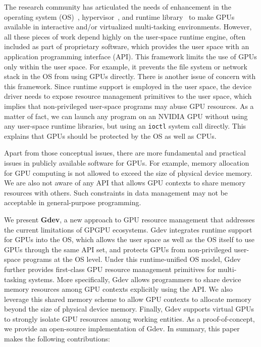 The research community has articulated the needs of enhancement in 
the operating system (OS)~\cite{Bautin_MCNC08, Kato_ATC11,
Rossbach_SOSP11}, hypervisor~\cite{Gupta_ATC11}, and runtime
library~\cite{Kato_RTSS11} to make GPUs available in interactive
and/or virtualized multi-tasking environments.
However, all these pieces of work depend highly on the user-space runtime
engine, often included as part of proprietary software, which provides
the user space with an application programming interface (API).
This framework limits the use of GPUs only within the user space.
For example, it prevents the file system or network stack in the OS from
using GPUs directly.
There is another issue of concern with this framework.
Since runtime support is employed in the user space, the device
driver needs to expose resource management primitives to the user space,
which implies that non-privileged user-space programs may abuse GPU
resources.
As a matter of fact, we can launch any program on an NVIDIA GPU without
using any user-space runtime libraries, but using an \texttt{ioctl}
system call directly. 
This explains that GPUs should be protected by the OS as well as CPUs.

Apart from those conceptual issues, there are more fundamental and
practical issues in publicly available software for GPUs.
For example, memory allocation for GPU computing is not allowed to
exceed the size of physical device memory.
We are also not aware of any API that allows GPU contexts to share
memory resources with others.
Such constraints in data management may not be acceptable in
general-purpose programming.

We present \textbf{Gdev}, a new approach to GPU resource management that
addresses the current limitations of GPGPU ecosystems.
Gdev integrates runtime support for GPUs into the OS, which allows the
user space as well as the OS itself to use GPUs through the same API
set, and protects GPUs from non-privileged user-space programs at the OS
level.
Under this runtime-unified OS model, Gdev further provides first-class GPU
resource management primitives for multi-tasking systems.
More specifically, Gdev allows programmers to share device memory
resources among GPU contexts explicitly using the API. 
We also leverage this shared memory scheme to allow GPU contexts to
allocate memory beyond the size of physical device memory.
Finally, Gdev supports virtual GPUs to strongly isolate GPU resources
among working entities.
As a proof-of-concept, we provide an open-source implementation of Gdev.
In summary, this paper makes the following contributions:

